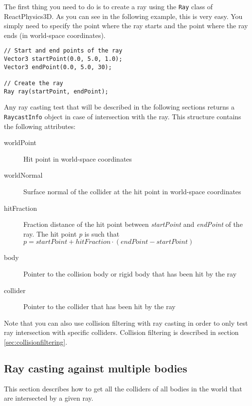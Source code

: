 \documentclass[a4paper,12pt]{article}
\begin{document}
    The first thing you need to do is to create a ray using the \texttt{Ray} class of ReactPhysics3D. As you can see in the following example, this is
    very easy. You simply need to specify the point where the ray starts and the point where the ray ends (in world-space coordinates). \\

    \begin{lstlisting}
// Start and end points of the ray
Vector3 startPoint(0.0, 5.0, 1.0);
Vector3 endPoint(0.0, 5.0, 30);

// Create the ray
Ray ray(startPoint, endPoint);
  \end{lstlisting}

    \vspace{0.6cm}

    Any ray casting test that will be described in the following sections returns a \texttt{RaycastInfo} object in case of intersection with the ray.
    This structure contains the following attributes: \\

    \begin{description}
         \item[worldPoint] Hit point in world-space coordinates
         \item[worldNormal] Surface normal of the collider at the hit point in world-space coordinates
         \item[hitFraction] Fraction distance of the hit point between \emph{startPoint}  and \emph{endPoint} of the ray. The hit point \emph{p} is such that
           $p = startPoint + hitFraction \cdot (endPoint - startPoint)$
         \item[body] Pointer to the collision body or rigid body that has been hit by the ray
         \item[collider] Pointer to the collider that has been hit by the ray
    \end{description}

    Note that you can also use collision filtering with ray casting in order to only test ray intersection with specific colliders.
    Collision filtering is described in section \ref{sec:collisionfiltering}.

    \subsection{Ray casting against multiple bodies}

    This section describes how to get all the colliders of all bodies in the world that are intersected by a given ray.
\end{document}
